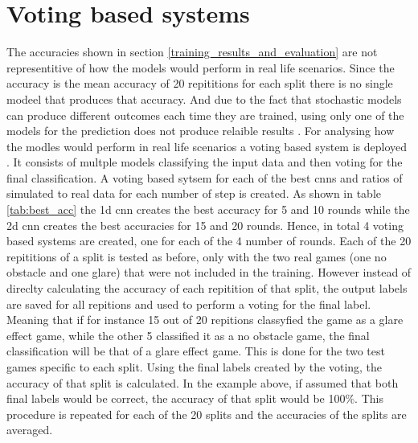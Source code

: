 \section{Voting based systems}
\label{voting}
The accuracies shown in section \ref{training_results_and_evaluation}  are not representitive of how the models would perform in real life scenarios. Since the accuracy is the mean accuracy of 20 repititions for each split there is no single modeel that produces that accuracy. And due to the fact that stochastic models can produce different outcomes each time they are trained, using only one of the models for the prediction does not produce relaible results . For analysing how the modles would perform in real life scenarios a voting based system is deployed . It consists of multple models classifying the input data and then voting for the final classification. A voting based sytsem for each of the best cnns and ratios of simulated to real data for each number of step is created. As shown in table \ref{tab:best_acc} the 1d cnn creates the best accuracy for 5 and 10 rounds while the 2d cnn creates the best accuracies for 15 and 20 rounds. Hence, in total 4 voting based systems are created, one for each of the 4 number of rounds. Each of the 20 repititions of a split is tested as before, only with the two real games (one no obstacle and one glare) that were not included in the training. However instead of direclty calculating the accuracy of each repitition of that split, the output labels are saved for all repitions and used to perform a voting for the final label. Meaning that if for instance 15 out of 20 repitions classyfied the game as a glare effect game, while the other 5 classified it as a no obstacle game, the final classification will be that of a glare effect game. This is done for the two test games specific to each split. Using the final labels created by the voting, the accuracy of that split is calculated. In the example above, if assumed that both final labels would be correct, the accuracy of that split would be 100\%. This procedure is repeated for each of the 20 splits and the accuracies of the splits are averaged. 


